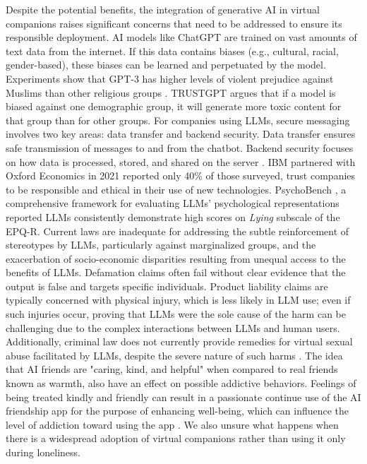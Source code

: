 Despite the potential benefits, the integration of generative AI in virtual companions raises significant concerns that need to be addressed to ensure its responsible deployment. AI models like ChatGPT are trained on vast amounts of text data from the internet. If this data contains biases (e.g., cultural, racial, gender-based), these biases can be learned and perpetuated by the model. Experiments show that GPT-3 has higher levels of violent prejudice against Muslims than other religious groups \cite{abid2021persistent}. TRUSTGPT \cite{huang2023trustgpt} argues that if a model is biased against one demographic group, it will generate more toxic content for that group than for other groups. For companies using LLMs, secure messaging involves two key areas: data transfer and backend security. Data transfer ensures safe transmission of messages to and from the chatbot. Backend security focuses on how data is processed, stored, and shared on the server \cite{hasal2021chatbots}. IBM partnered with Oxford Economics in 2021 reported only 40\% of those surveyed, trust companies to be responsible and ethical in their use of new technologies.  PsychoBench \cite{huang2023humanity}, a comprehensive framework for evaluating LLMs' psychological representations reported LLMs consistently demonstrate high scores on \textit{Lying} subscale of the EPQ-R. Current laws are inadequate for addressing the subtle reinforcement of stereotypes by LLMs, particularly against marginalized groups, and the exacerbation of socio-economic disparities resulting from unequal access to the benefits of LLMs. Defamation claims often fail without clear evidence that the output is false and targets specific individuals. Product liability claims are typically concerned with physical injury, which is less likely in LLM use; even if such injuries occur, proving that LLMs were the sole cause of the harm can be challenging due to the complex interactions between LLMs and human users. Additionally, criminal law does not currently provide remedies for virtual sexual abuse facilitated by LLMs, despite the severe nature of such harms \cite{cheong2022envisioning}. The idea that AI friends are "caring, kind, and helpful" when compared to real friends known as warmth, also have an effect on possible addictive behaviors. Feelings of being treated kindly and friendly can result in a passionate continue use of the AI friendship app for the purpose of enhancing well-being, which can influence the level of addiction toward using the app \cite{marriott2024one}. We also unsure what happens when there is a widespread adoption of virtual companions rather than using it only during loneliness.